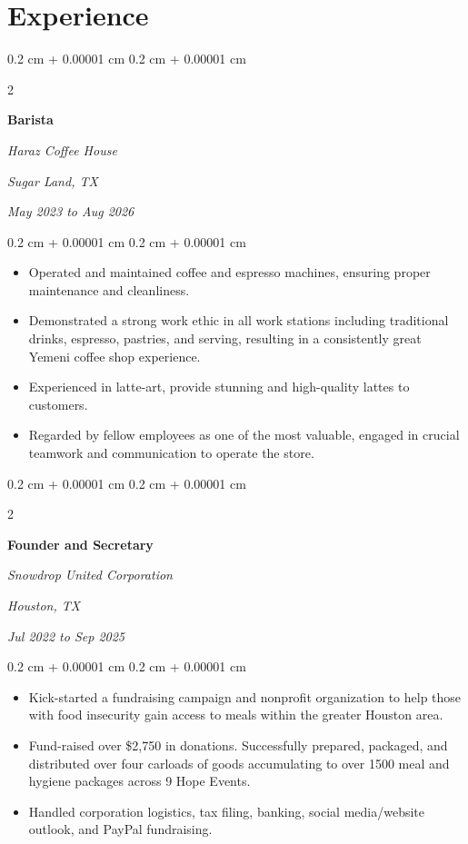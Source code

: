 \documentclass[10pt, letterpaper]{article}
\newenvironment{highlights}{
    \begin{itemize}[
        topsep=0.10 cm,
        parsep=0.10 cm,
        partopsep=0pt,
        itemsep=0pt,
        leftmargin=0.4 cm + 10pt
    ]
}{
    \end{itemize}
} %
\newenvironment{onecolentry}{
    \begin{adjustwidth}{
        0.2 cm + 0.00001 cm
    }{
        0.2 cm + 0.00001 cm
    }
}{
    \end{adjustwidth}
} %
\newenvironment{twocolentry}[2][]{
    \onecolentry
    \def\secondColumn{#2}
    \setcolumnwidth{\fill, 4.5 cm}
    \begin{paracol}{2}
}{
    \switchcolumn \raggedleft \secondColumn
    \end{paracol}
    \endonecolentry
} %
\begin{document}
    
    \section{Experience}



        
        \begin{twocolentry}{
        \textit{Sugar Land, TX}    
            
        \textit{May 2023 to Aug 2026}}
            \textbf{Barista}
            
            \textit{Haraz Coffee House}
        \end{twocolentry}

        \vspace{0.10 cm}
        \begin{onecolentry}
            \begin{highlights}
                \item Operated and maintained coffee and espresso machines, ensuring proper maintenance and cleanliness.
                \item Demonstrated a strong work ethic in all work stations including traditional drinks, espresso, pastries, and serving, resulting in a consistently great Yemeni coffee shop experience.
                \item Experienced in latte-art, provide stunning and high-quality lattes to customers.
                \item Regarded by fellow employees as one of the most valuable, engaged in crucial teamwork and communication to operate the store.
            \end{highlights}
        \end{onecolentry}


        \vspace{0.2 cm}

        \begin{twocolentry}{
        \textit{Houston, TX}    
            
        \textit{Jul 2022 to Sep 2025}}
            \textbf{Founder and Secretary}
            
            \textit{Snowdrop United Corporation}
        \end{twocolentry}

        \vspace{0.10 cm}
        \begin{onecolentry}
            \begin{highlights}
                \item Kick-started a fundraising campaign and nonprofit organization to help those with food insecurity gain access to meals within the greater Houston area.
                \item Fund-raised over \$2,750 in donations. Successfully prepared, packaged, and distributed over four carloads of goods accumulating to over 1500 meal and hygiene packages across 9 Hope Events.
                \item Handled corporation logistics, tax filing, banking, social media/website outlook, and PayPal fundraising.
            \end{highlights}
        \end{onecolentry}
\end{document}
